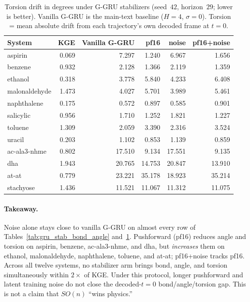 \documentclass{article}
\newcommand{\GKE}{\textsc{KGE}}
\newcommand{\GGRU}{\textsc{G-GRU}}
\begin{document}
\begin{table}[H]
\centering
\caption{Torsion drift in degrees under \GGRU{} stabilizers (seed~$42$, horizon~$29$; lower is better). Vanilla \GGRU{} is the main-text baseline ($H{=}4$, $\sigma{=}0$). Torsion = mean absolute drift from each trajectory's own decoded frame at $t=0$.}
\label{tab:gru_stab_torsion}
{\footnotesize
\setlength{\tabcolsep}{4pt}
\begin{tabular}{lrrrrr}
\toprule
\textbf{System} & \GKE{} & Vanilla \GGRU{} & pf16 & noise & pf16+noise \\
\midrule
aspirin & 0.069 & 7.297 & 1.240 & 6.967 & 1.656 \\
benzene & 0.932 & 2.128 & 1.366 & 2.119 & 1.359 \\
ethanol & 0.318 & 3.778 & 5.840 & 4.233 & 6.408 \\
malonaldehyde & 1.473 & 4.027 & 5.701 & 3.989 & 5.461 \\
naphthalene & 0.175 & 0.572 & 0.897 & 0.585 & 0.901 \\
salicylic & 0.956 & 1.710 & 1.252 & 1.821 & 1.227 \\
toluene & 1.309 & 2.059 & 3.390 & 2.316 & 3.524 \\
uracil & 0.203 & 1.102 & 0.853 & 1.139 & 0.859 \\
ac-ala3-nhme & 0.802 & 17.510 & 9.134 & 17.551 & 9.135 \\
dha & 1.943 & 20.765 & 14.753 & 20.847 & 13.910 \\
at-at & 0.779 & 23.221 & 35.178 & 18.923 & 35.214 \\
stachyose & 1.436 & 11.521 & 11.067 & 11.312 & 11.075 \\
\bottomrule
\end{tabular}}
\end{table}

\paragraph{Takeaway.}
Noise alone stays close to vanilla \GGRU{} on almost every row of Tables~\ref{tab:gru_stab_bond_angle} and~\ref{tab:gru_stab_torsion}.
Pushforward (pf16) reduces angle and torsion on aspirin, benzene, ac-ala3-nhme, and dha, but \emph{increases} them on ethanol, malonaldehyde, naphthalene, toluene, and at-at; pf16+noise tracks pf16.
Across all twelve systems, no stabilizer arm brings bond, angle, and torsion simultaneously within $2\times$ of \GKE{}.
Under this protocol, longer pushforward and latent training noise do not close the decoded-$t=0$ bond/angle/torsion gap. This is not a claim that $SO(n)$ ``wins physics.''
\end{document}
